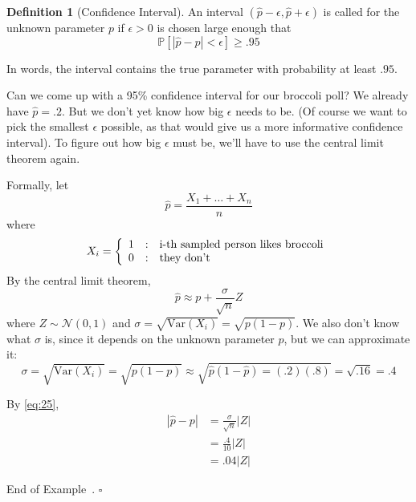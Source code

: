 \documentclass[10pt]{article}
\theoremstyle{definition}
\newtheorem{definition}[theorem]{Definition}
\newtheorem{example}[theorem]{Example}
\renewenvironment{example}
{\begin{oldexample}}
  {\par\smallskip\hfill   End of Example~\theexample. $\square$    \par\end{oldexample}}
\newcommand{\1}[1]{\textbf{1}_{\left[#1\right]}} %
\def\P{\mathbb{P}} %
\def\Var{\mathrm{Var}} %
\newcommand{\dempfcolor}[1]{{\color{RoyalBlue}#1}}
\newcommand{\demph}[1]{\dempfcolor{{\sl \textbf{#1}}}}
\begin{document}
\begin{definition}[Confidence Interval]
  An interval $(\widehat{p}-\epsilon,\widehat{p}+\epsilon)$ is called
  \demph{95\% confidence interval} for the unknown parameter $p$ if
  $\epsilon>0$ is chosen large enough that
  \begin{equation}\label{eq:19}
    \P\left[\left| \widehat{p}-p \right| <\epsilon\right] \geq .95
  \end{equation}
\end{definition}
In words, the interval contains the true parameter with probability at least
$.95$.
\begin{example}
  Can we come up with a 95\% confidence interval for our broccoli poll? We
  already have $\widehat{p}=.2$. But we don't yet know how big $\epsilon$ needs
  to be. (Of course we want to pick the smallest $\epsilon$ possible, as that
  would give us a more informative confidence interval). To figure out how big 
  $\epsilon$ must be, we'll have to use the central limit theorem again.

  Formally, let
  \begin{equation*}
    \widehat{p}=\frac{X_{1}+\ldots+X_{n}}{n}
  \end{equation*}
  where
  \begin{equation*}
    X_{i}  =\left\{ \begin{array}{l@{\quad:\quad}l} 1 & \text{i-th sampled person
          likes broccoli}\\ 0 &\text{they don't} \end{array}\right.
  \end{equation*}
  By the central limit theorem,
  \begin{equation}\label{eq:25}
    \widehat{p} \approx p + \frac{\sigma}{\sqrt{n}}Z
  \end{equation}
  where $Z\sim \mathcal{N}(0,1)$ and $\sigma =\sqrt{\Var(X_{i})}=\sqrt{p(1-p)}$. We also
  don't know what $\sigma$ is, since it depends on the unknown parameter
  $p$, but we can approximate it:
  \begin{equation}\label{eq:26}
    \sigma = \sqrt{\Var(X_{i})} = \sqrt{p(1-p)} \approx \sqrt{\widehat{p}(1-\widehat{p})=(.2)(.8)}=\sqrt{.16} = .4
  \end{equation}

  By \cref{eq:25},
  \begin{align*}
    \left| \widehat{p}-p \right| 
    &= \frac{\sigma}{\sqrt{n}}|Z|\\
    &= \frac{.4}{10} |Z|\\
    &= .04 |Z|
  \end{align*}


\end{example}
\end{document}
